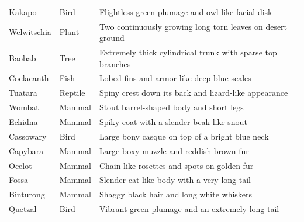 \begin{table}[p]
\begin{tabular}{@{}p{}p{}p{}@{}}
\raggedright Kakapo & \raggedright Bird & \raggedright Flightless green plumage and owl-like facial disk\tabularnewline
\raggedright Welwitschia & \raggedright Plant & \raggedright Two continuously growing long torn leaves on desert ground\tabularnewline
\raggedright Baobab & \raggedright Tree & \raggedright Extremely thick cylindrical trunk with sparse top branches\tabularnewline
\raggedright Coelacanth & \raggedright Fish & \raggedright Lobed fins and armor-like deep blue scales\tabularnewline
\raggedright Tuatara & \raggedright Reptile & \raggedright Spiny crest down its back and lizard-like appearance\tabularnewline
\raggedright Wombat & \raggedright Mammal & \raggedright Stout barrel-shaped body and short legs\tabularnewline
\raggedright Echidna & \raggedright Mammal & \raggedright Spiky coat with a slender beak-like snout\tabularnewline
\raggedright Cassowary & \raggedright Bird & \raggedright Large bony casque on top of a bright blue neck\tabularnewline
\raggedright Capybara & \raggedright Mammal & \raggedright Large boxy muzzle and reddish-brown fur\tabularnewline
\raggedright Ocelot & \raggedright Mammal & \raggedright Chain-like rosettes and spots on golden fur\tabularnewline
\raggedright Fossa & \raggedright Mammal & \raggedright Slender cat-like body with a very long tail\tabularnewline
\raggedright Binturong & \raggedright Mammal & \raggedright Shaggy black hair and long white whiskers\tabularnewline
\raggedright Quetzal & \raggedright Bird & \raggedright Vibrant green plumage and an extremely long tail\tabularnewline
\bottomrule
\end{tabular}
\end{table}

